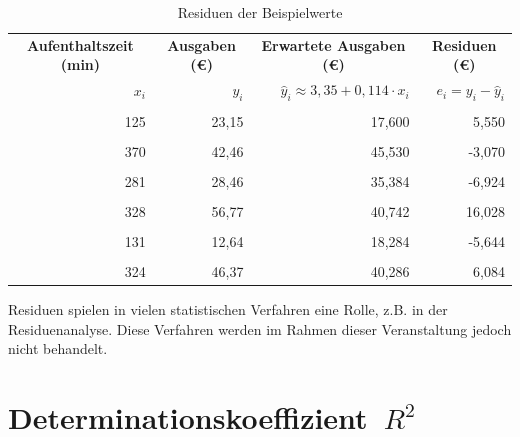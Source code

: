 \documentclass[
  11pt,
  ngerman,
  a4paper,
]{report}
\begin{document}
\begin{table}

\caption{\label{tab:res2}Residuen der Beispielwerte}
\centering
\begin{tabular}[t]{rrrr}
\toprule
\multicolumn{1}{c}{\textbf{Aufenthaltszeit (min)}} & \multicolumn{1}{c}{\textbf{Ausgaben (€)}} & \multicolumn{1}{c}{\textbf{Erwartete Ausgaben (€)}} & \multicolumn{1}{c}{\textbf{Residuen (€)}} \\
\cmidrule(l{3pt}r{3pt}){1-1} \cmidrule(l{3pt}r{3pt}){2-2} \cmidrule(l{3pt}r{3pt}){3-3} \cmidrule(l{3pt}r{3pt}){4-4}
\textbf{$x_i$} & \textbf{$y_i$} & \textbf{$\hat{y}_i\approx3{,}35+0{,}114\cdot x_i$} & \textbf{$e_i=y_i-\hat{y}_i$}\\
\midrule
\cellcolor{gray!6}{121} & \cellcolor{gray!6}{17,94} & \cellcolor{gray!6}{17,144} & \cellcolor{gray!6}{0,796}\\
125 & 23,15 & 17,600 & 5,550\\
\cellcolor{gray!6}{293} & \cellcolor{gray!6}{44,31} & \cellcolor{gray!6}{36,752} & \cellcolor{gray!6}{7,558}\\
370 & 42,46 & 45,530 & -3,070\\
\cellcolor{gray!6}{246} & \cellcolor{gray!6}{35,51} & \cellcolor{gray!6}{31,394} & \cellcolor{gray!6}{4,116}\\
281 & 28,46 & 35,384 & -6,924\\
\cellcolor{gray!6}{169} & \cellcolor{gray!6}{18,47} & \cellcolor{gray!6}{22,616} & \cellcolor{gray!6}{-4,146}\\
328 & 56,77 & 40,742 & 16,028\\
\cellcolor{gray!6}{388} & \cellcolor{gray!6}{40,11} & \cellcolor{gray!6}{47,582} & \cellcolor{gray!6}{-7,472}\\
131 & 12,64 & 18,284 & -5,644\\
\cellcolor{gray!6}{299} & \cellcolor{gray!6}{24,54} & \cellcolor{gray!6}{37,436} & \cellcolor{gray!6}{-12,896}\\
324 & 46,37 & 40,286 & 6,084\\
\bottomrule
\end{tabular}
\end{table}

Residuen spielen in vielen statistischen Verfahren eine Rolle, z.B. in der Residuenanalyse. Diese Verfahren werden im Rahmen dieser Veranstaltung jedoch nicht behandelt.

\hypertarget{determinationskoeffizient}{%
\section{\texorpdfstring{Determinationskoeffizient~\(R^2\)}{Determinationskoeffizient~R\^{}2}}\label{determinationskoeffizient}}
\end{document}
